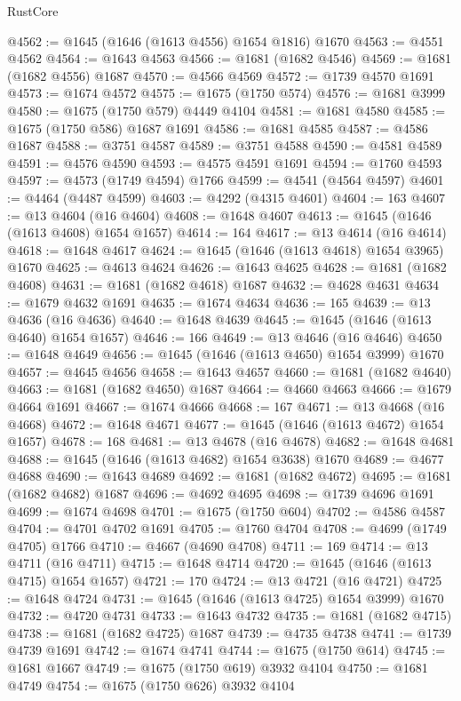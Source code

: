 \begin{lexlean}{RustCore}
\begin{coremodule}
@4562 := @1645 (@1646 (@1613 @4556) @1654 @1816) @1670
@4563 := @4551 @4562
@4564 := @1643 @4563
@4566 := @1681 (@1682 @4546)
@4569 := @1681 (@1682 @4556) @1687
@4570 := @4566 @4569
@4572 := @1739 @4570 @1691
@4573 := @1674 @4572
@4575 := @1675 (@1750 @574)
@4576 := @1681 @3999
@4580 := @1675 (@1750 @579) @4449 @4104
@4581 := @1681 @4580
@4585 := @1675 (@1750 @586) @1687 @1691
@4586 := @1681 @4585
@4587 := @4586 @1687
@4588 := @3751 @4587
@4589 := @3751 @4588
@4590 := @4581 @4589
@4591 := @4576 @4590
@4593 := @4575 @4591 @1691
@4594 := @1760 @4593
@4597 := @4573 (@1749 @4594) @1766
@4599 := @4541 (@4564 @4597)
@4601 := @4464 (@4487 @4599)
@4603 := @4292 (@4315 @4601)
@4604 := 163
@4607 := @13 @4604 (@16 @4604)
@4608 := @1648 @4607
@4613 := @1645 (@1646 (@1613 @4608) @1654 @1657)
@4614 := 164
@4617 := @13 @4614 (@16 @4614)
@4618 := @1648 @4617
@4624 := @1645 (@1646 (@1613 @4618) @1654 @3965) @1670
@4625 := @4613 @4624
@4626 := @1643 @4625
@4628 := @1681 (@1682 @4608)
@4631 := @1681 (@1682 @4618) @1687
@4632 := @4628 @4631
@4634 := @1679 @4632 @1691
@4635 := @1674 @4634
@4636 := 165
@4639 := @13 @4636 (@16 @4636)
@4640 := @1648 @4639
@4645 := @1645 (@1646 (@1613 @4640) @1654 @1657)
@4646 := 166
@4649 := @13 @4646 (@16 @4646)
@4650 := @1648 @4649
@4656 := @1645 (@1646 (@1613 @4650) @1654 @3999) @1670
@4657 := @4645 @4656
@4658 := @1643 @4657
@4660 := @1681 (@1682 @4640)
@4663 := @1681 (@1682 @4650) @1687
@4664 := @4660 @4663
@4666 := @1679 @4664 @1691
@4667 := @1674 @4666
@4668 := 167
@4671 := @13 @4668 (@16 @4668)
@4672 := @1648 @4671
@4677 := @1645 (@1646 (@1613 @4672) @1654 @1657)
@4678 := 168
@4681 := @13 @4678 (@16 @4678)
@4682 := @1648 @4681
@4688 := @1645 (@1646 (@1613 @4682) @1654 @3638) @1670
@4689 := @4677 @4688
@4690 := @1643 @4689
@4692 := @1681 (@1682 @4672)
@4695 := @1681 (@1682 @4682) @1687
@4696 := @4692 @4695
@4698 := @1739 @4696 @1691
@4699 := @1674 @4698
@4701 := @1675 (@1750 @604)
@4702 := @4586 @4587
@4704 := @4701 @4702 @1691
@4705 := @1760 @4704
@4708 := @4699 (@1749 @4705) @1766
@4710 := @4667 (@4690 @4708)
@4711 := 169
@4714 := @13 @4711 (@16 @4711)
@4715 := @1648 @4714
@4720 := @1645 (@1646 (@1613 @4715) @1654 @1657)
@4721 := 170
@4724 := @13 @4721 (@16 @4721)
@4725 := @1648 @4724
@4731 := @1645 (@1646 (@1613 @4725) @1654 @3999) @1670
@4732 := @4720 @4731
@4733 := @1643 @4732
@4735 := @1681 (@1682 @4715)
@4738 := @1681 (@1682 @4725) @1687
@4739 := @4735 @4738
@4741 := @1739 @4739 @1691
@4742 := @1674 @4741
@4744 := @1675 (@1750 @614)
@4745 := @1681 @1667
@4749 := @1675 (@1750 @619) @3932 @4104
@4750 := @1681 @4749
@4754 := @1675 (@1750 @626) @3932 @4104

\end{coremodule}
\end{lexlean}
